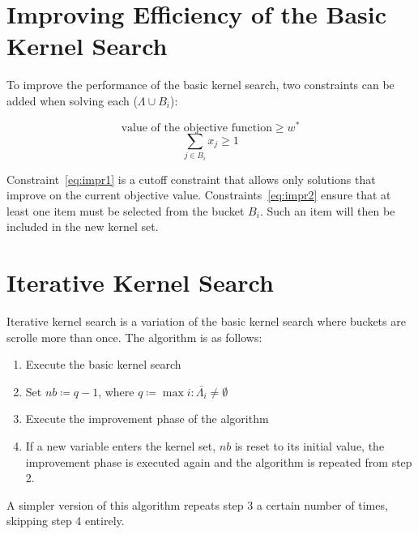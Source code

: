 \section{Improving Efficiency of the Basic Kernel Search}
To improve the performance of the basic kernel search, two constraints can be added
when solving each (\(\Lambda \cup B_{i}\)):

\begin{equation}
    \label{eq:impr1}
    \text{value of the objective function} \geq w^{*}
\end{equation}
\begin{equation}
    \label{eq:impr2}
    \sum_{j \in B_{i}} x_{j} \geq 1
\end{equation}

Constraint~\eqref{eq:impr1} is a cutoff constraint that allows only solutions that improve on the current
objective value.
Constraints~\eqref{eq:impr2} ensure that at least one item must be selected from the bucket \(B_{i}\).
Such an item will then be included in the new kernel set.


\section{Iterative Kernel Search}
Iterative kernel search is a variation of the basic kernel search where buckets are scrolle more than once.
The algorithm is as follows:
\begin{enumerate}
    \item Execute the basic kernel search
    \item Set \(nb \coloneqq q-1\), where \(q \coloneqq \max{i:\bar{\Lambda_{i}} \neq \emptyset}\)
    \item Execute the improvement phase of the algorithm
    \item If a new variable enters the kernel set, \(nb\) is reset to its initial value,
    the improvement phase is executed again and the algorithm is repeated from step 2.
\end{enumerate}

A simpler version of this algorithm repeats step 3 a certain number of times, skipping step 4 entirely.